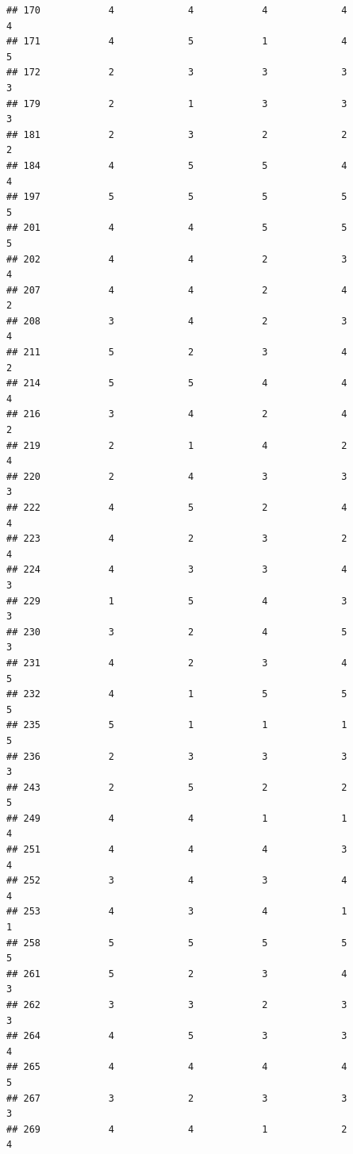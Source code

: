 \documentclass[
]{article}
\begin{document}
\begin{verbatim}
## 170            4             4            4             4          4
## 171            4             5            1             4          5
## 172            2             3            3             3          3
## 179            2             1            3             3          3
## 181            2             3            2             2          2
## 184            4             5            5             4          4
## 197            5             5            5             5          5
## 201            4             4            5             5          5
## 202            4             4            2             3          4
## 207            4             4            2             4          2
## 208            3             4            2             3          4
## 211            5             2            3             4          2
## 214            5             5            4             4          4
## 216            3             4            2             4          2
## 219            2             1            4             2          4
## 220            2             4            3             3          3
## 222            4             5            2             4          4
## 223            4             2            3             2          4
## 224            4             3            3             4          3
## 229            1             5            4             3          3
## 230            3             2            4             5          3
## 231            4             2            3             4          5
## 232            4             1            5             5          5
## 235            5             1            1             1          5
## 236            2             3            3             3          3
## 243            2             5            2             2          5
## 249            4             4            1             1          4
## 251            4             4            4             3          4
## 252            3             4            3             4          4
## 253            4             3            4             1          1
## 258            5             5            5             5          5
## 261            5             2            3             4          3
## 262            3             3            2             3          3
## 264            4             5            3             3          4
## 265            4             4            4             4          5
## 267            3             2            3             3          3
## 269            4             4            1             2          4

\end{verbatim}
\end{document}

